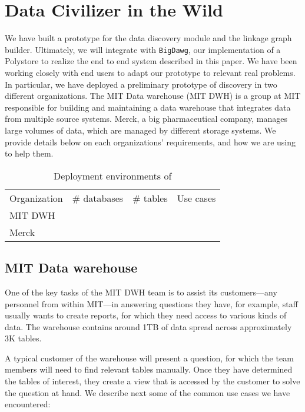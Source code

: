 \section{Data Civilizer in the Wild}
\label{sec:wild}

We have built a prototype for the data discovery module and the linkage graph builder.
Ultimately, we will integrate \dcv with \texttt{BigDawg}, our implementation of a Polystore to realize the end to end system described in this paper. 
We have been working closely with end users to adapt our prototype to relevant real problems. 
In particular, we have deployed a preliminary prototype of discovery in two different organizations. 
The MIT Data warehouse (MIT DWH) is a group at MIT responsible for building and maintaining a data warehouse that integrates data from multiple source systems. Merck, a big pharmaceutical company, manages large volumes of data, which are managed by different storage systems. 
We provide details below on each organizations' requirements, and how we are using \dcv to help them.


\begin{table}
\caption{Deployment environments of \dcv{}}\label{tab:dataCivInTheWild}
\begin{tabular}{|l|l|l|l|}
\hline
Organization & \# databases & \# tables & Use cases\\
MIT DWH & & & \\
Merck & & & \\
\hline
\end{tabular}
\end{table}


\subsection{MIT Data warehouse}


One of the key tasks of the MIT DWH team is to assist its customers—any personnel from within MIT—in answering questions they have, for example, staff usually wants to create reports, for which they need access to various kinds of data. The warehouse contains around 1TB of data spread across approximately 3K tables.

A typical customer of the warehouse will present a question, for which the team members will need to find relevant tables manually. Once they have determined the tables of interest, they create a view that is accessed by the customer to solve the question at hand. We describe next some of the common use cases we have encountered:

